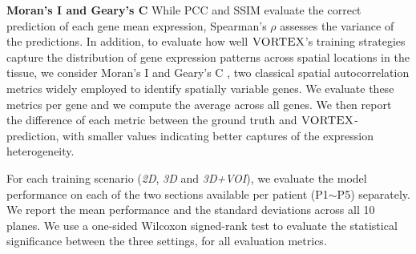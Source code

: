 \noindent\textbf{Moran's I and Geary's C} While PCC and SSIM evaluate the correct prediction of each gene mean expression, Spearman's $\rho$ assesses the variance of the predictions. In addition, to evaluate how well $\textsc{VORTEX}$'s training strategies capture the distribution of gene expression patterns across spatial locations in the tissue, we consider Moran's I \cite{moran1950notes} and Geary's C \cite{geary1954contiguity}, two classical spatial autocorrelation metrics widely employed to identify spatially variable genes. We evaluate these metrics per gene and we compute the average across all genes. We then report the difference of each metric between the ground truth and $\textsc{VORTEX}$-prediction, with smaller values indicating better captures of the expression heterogeneity. 



For each training scenario (\textit{2D}, \textit{3D} and \textit{3D+VOI}), we evaluate the model performance on each of the two sections available per patient (P1$\sim$P5) separately. We report the mean performance and the standard deviations across all 10 planes. We use a one-sided Wilcoxon signed-rank test to evaluate the statistical significance between the three settings, for all evaluation metrics.

